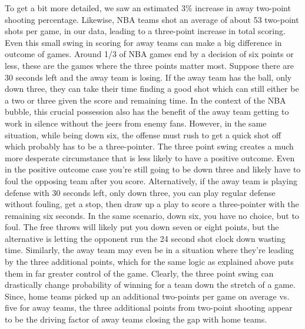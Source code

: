 \documentclass[10pt]{article}
\begin{document}
To get a bit more detailed, we saw an estimated 3\% increase in away two-point
shooting percentage. Likewise, NBA teams shot
an average of about 53 two-point shots per game, in our data, leading to
a three-point increase in total scoring. Even this
small swing in scoring for away teams can make a big difference in outcome of
games. Around 1/3 of NBA games end by a decision of six points or less, these
are the games where the three points matter most. Suppose there are 30 seconds
left and the away team is losing. If the away team has the ball, only down three, 
they can take their time finding a good shot which can
still either be a two or three given the score and remaining time. In the context 
of the NBA bubble, this crucial possession also has the benefit of the away team
getting to work in silence without the jeers from enemy fans. However, in the
same situation, while being down six, the offense must rush to get a quick shot
off which probably has to be a three-pointer. The three point swing creates a much more desperate
circumstance that is less likely to have a positive outcome. Even in the positive
outcome case you're still going to be down three and likely have to foul the
opposing team after you score. 
Alternatively, if the away team is playing defense with 30 seconds left, only down 
three, you can play regular defense without fouling, get a stop, then draw up a play
to score a three-pointer with the remaining six seconds. In the same scenario, down 
six, you have no choice, but to foul. The free throws will likely put you down seven
or eight points, but the alternative is letting the opponent run the 24 second shot 
clock down wasting time. Similarly, the away team may even be in a situation where 
they're leading by the three additional points, which for the same logic as explained
above puts them in far greater control of the game. Clearly, the three point swing 
can drastically change probability of winning for a team down the stretch of a game. 
Since, home teams picked up an additional two-points per game on average vs. five for 
away teams, the three additional points from two-point shooting appear to be the driving
factor of away teams closing the gap with home teams.
\end{document}

